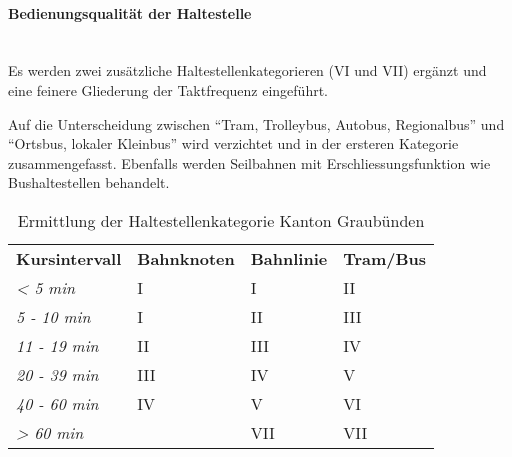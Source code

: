\paragraph{Bedienungsqualität der Haltestelle}~\\
\label{Berechnungsmethodik Kanton Graubünden:Bedienungsqualität der Haltestelle}
Es werden zwei zusätzliche Haltestellenkategorieren (VI und VII) ergänzt und eine feinere Gliederung der Taktfrequenz eingeführt.

Auf die Unterscheidung zwischen "`Tram, Trolleybus, Autobus, Regionalbus"' und "`Ortsbus, lokaler Kleinbus"' wird verzichtet und in der ersteren Kategorie zusammengefasst.
Ebenfalls werden Seilbahnen mit Erschliessungsfunktion wie Bushaltestellen behandelt.

\begin{table}[ht]
    \begin{tabular}[c]{l p{4.0cm} p{4.0cm} p{4.0cm}}
        \midrule
        \textbf{Kursintervall}
                                & \textbf{Bahnknoten}
                                & \textbf{Bahnlinie}
                                & \textbf{Tram/Bus}\\
        \textit{< 5 min}
                                & I
                                & I
                                & II\\
        \cellcolor{red!25}\textit{5 - 10 min}
                                & I
                                & II
                                & III\\
        \cellcolor{red!25}\textit{11 - 19 min}
                                & II
                                & III
                                & IV\\
        \textit{20 - 39 min}
                                & III
                                & IV
                                & V\\
        \textit{40 - 60 min}
                                & IV
                                & V
                                & \cellcolor{red!25}VI\\
        \cellcolor{red!25}\textit{> 60 min}
                                &
                                & \cellcolor{red!25}VII
                                & \cellcolor{red!25}VII\\
        \bottomrule
    \end{tabular}
    \caption{Ermittlung der Haltestellenkategorie Kanton Graubünden}
    \label{table:Ermittlung der Haltestellenkategorie Kanton Graubünden}
\end{table}

